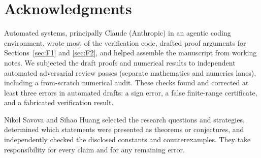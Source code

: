 \documentclass[11pt]{amsart}
\theoremstyle{plain}
\theoremstyle{definition}
\theoremstyle{remark}
\begin{document}
\section*{Acknowledgments}

Automated systems, principally Claude (Anthropic) in an agentic coding
environment, wrote most of the verification code, drafted proof arguments
for Sections~\ref{sec:F1} and \ref{sec:F2}, and helped assemble the
manuscript from working notes. We subjected the draft proofs and numerical
results to independent automated adversarial review passes (separate
mathematics and numerics lanes), including a from-scratch numerical
audit. These checks found and corrected at least three errors in automated
drafts: a sign error, a false finite-range certificate, and a fabricated
verification result.

Nikol Savova and Sihao Huang selected the research questions and
strategies, determined which statements were presented as theorems or
conjectures, and independently checked the disclosed constants and
counterexamples. They take responsibility for every claim and for any
remaining error.
\end{document}
